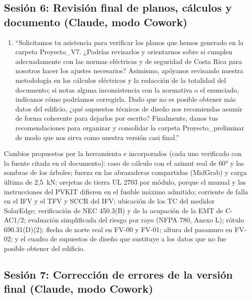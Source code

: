 \subsection*{Sesión 6: Revisión final de planos, cálculos y documento (Claude, modo Cowork)}

\begin{enumerate}[resume]
    \item ``Solicitamos tu asistencia para verificar los planos que hemos generado en la carpeta Proyecto\_V7. ¿Podrías revisarlos y orientarnos sobre si cumplen adecuadamente con las normas eléctricas y de seguridad de Costa Rica para nosotros hacer los ajustes necesarios? Asimismo, apóyanos revisando nuestra metodología en los cálculos eléctricos y la redacción de la totalidad del documento; si notas alguna inconsistencia con la normativa o el enunciado, indícanos cómo podríamos corregirla. Dado que no es posible obtener más datos del edificio, ¿qué supuestos técnicos de diseño nos recomiendas asumir de forma coherente para dejarlos por escrito? Finalmente, danos tus recomendaciones para organizar y consolidar la carpeta Proyecto\_preliminar de modo que nos sirva como nuestra versión casi final.''
\end{enumerate}
Cambios propuestos por la herramienta e incorporados (cada uno verificado con la fuente citada en el documento): caso de cálculo con el azimut real de 60° y las sombras de los árboles; fuerza en las abrazaderas compartidas (MidGrab) y carga última de 2,5~kN; orejetas de tierra UL 2703 por módulo, porque el manual y las instrucciones del PVKIT difieren en el fusible máximo admitido; corriente de falla en el IFV y el TFV y SCCR del IFV; ubicación de los TC del medidor SolarEdge; verificación de NEC 450.3(B) y de la ocupación de la EMT de C-AC1/2; evaluación simplificada del riesgo por rayo (NFPA 780, Anexo L); rótulo 690.31(D)(2); flecha de norte real en FV-00 y FV-01; altura del pasamuro en FV-02; y el cuadro de supuestos de diseño que sustituye a los datos que no fue posible obtener del edificio.

\subsection*{Sesión 7: Corrección de errores de la versión final (Claude, modo Cowork)}

